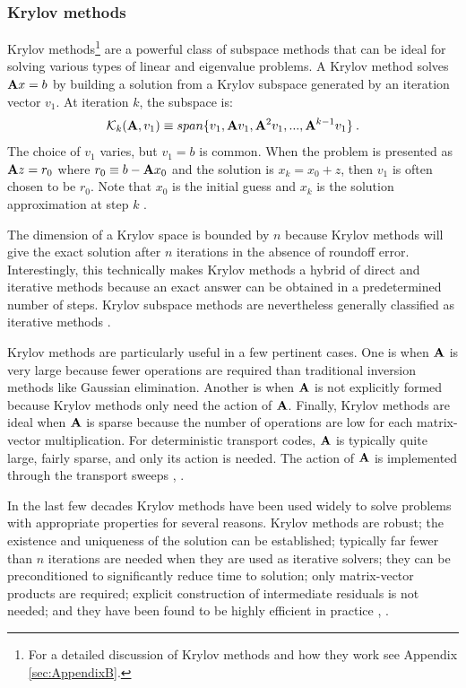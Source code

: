 \subsubsection{Krylov methods}
Krylov methods\footnote{For a detailed discussion of Krylov methods and how they work see Appendix \ref{sec:AppendixB}.} are a powerful class of subspace methods that can be ideal for solving various types of linear and eigenvalue problems. A Krylov method solves $\mathbf{A}x = b$ by building a solution from a Krylov subspace generated by an iteration vector $v_{1}$. At iteration $k$, the subspace is:
%
\begin{equation}
  \mathcal{K}_{k}(\mathbf{A},v_{1}) \equiv span\{v_{1}, \mathbf{A}v_{1}, \mathbf{A}^{2}v_{1}, ..., \mathbf{A}^{k-1}v_{1}\} \:.
  \label{eq:Krylov-subspace}
\end{equation}
%
The choice of $v_{1}$ varies, but $v_{1} = b$ is common. When the problem is presented as $\mathbf{A}z = r_{0}$ where $r_{0} \equiv b - \mathbf{A}x_{0}$ and the solution is $x_{k} = x_{0} + z$, then $v_{1} $ is often chosen to be $r_{0}$. Note that $x_{0}$ is the initial guess and $x_{k}$ is the solution approximation at step $k$  \cite{Ipsen1998}.

The dimension of a Krylov space is bounded by $n$ because Krylov methods will give the exact solution after $n$ iterations in the absence of roundoff error. Interestingly, this technically makes Krylov methods a hybrid of direct and iterative methods because an exact answer can be obtained in a predetermined number of steps. Krylov subspace methods are nevertheless generally classified as iterative methods \cite{Birkhoff1984}.

Krylov methods are particularly useful in a few pertinent cases. One is when $\mathbf{A}$ is very large because fewer operations are required than traditional inversion methods like Gaussian elimination. Another is when $\mathbf{A}$ is not explicitly formed because Krylov methods only need the action of $\mathbf{A}$. Finally, Krylov methods are ideal when $\mathbf{A}$ is sparse because the number of operations are low for each matrix-vector multiplication. For deterministic transport codes, $\mathbf{A}$ is typically quite large, fairly sparse, and only its action is needed. The action of $\mathbf{A}$ is implemented through the transport sweeps \cite{Lewis1993}, \cite{Ipsen1998}.  

In the last few decades Krylov methods have been used widely to solve problems with appropriate properties for several reasons. Krylov methods are robust; the existence and uniqueness of the solution can be established; typically far fewer than $n$ iterations are needed when they are used as iterative solvers; they can be preconditioned to significantly reduce time to solution; only matrix-vector products are required; explicit construction of intermediate residuals is not needed; and they have been found to be highly efficient in practice \cite{Ipsen1998}, \cite{Knoll2004}. 

